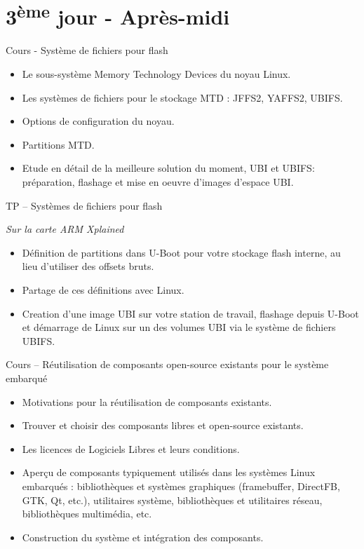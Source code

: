 \documentclass[a4paper,12pt,obeyspaces,spaces,hyphens]{article}
\begin{document}
\section{3\textsuperscript{ème} jour - Après-midi}

\feagendatwocolumn
{Cours - Système de fichiers pour flash}
{
  \begin{itemize}
  \item Le sous-système Memory Technology Devices du noyau Linux.
  \item Les systèmes de fichiers pour le stockage MTD : JFFS2, YAFFS2, UBIFS.
  \item Options de configuration du noyau.
  \item Partitions MTD.
  \item Etude en détail de la meilleure solution du moment, UBI et UBIFS:
	préparation, flashage et mise en oeuvre d'images d'espace UBI.

  \end{itemize}
}
{TP – Systèmes de fichiers pour flash}
{
  {\em Sur la carte ARM Xplained}
  \begin{itemize}
  \item Définition de partitions dans U-Boot pour
        votre stockage flash interne, au lieu d'utiliser
        des offsets bruts.
  \item Partage de ces définitions avec Linux.
  \item Creation d'une image UBI sur votre station de travail,
	flashage depuis U-Boot et démarrage de Linux sur un 
        des volumes UBI via le système de fichiers UBIFS.
  \end{itemize}
}

\feagendaonecolumn
{Cours – Réutilisation de composants open-source existants pour le système
embarqué}
{
  \begin{itemize}
  \item Motivations pour la réutilisation de composants existants.
  \item Trouver et choisir des composants libres et open-source existants.
  \item Les licences de Logiciels Libres et leurs conditions.
  \item Aperçu de composants typiquement utilisés dans les systèmes
	Linux embarqués : bibliothèques et systèmes graphiques (framebuffer,
	DirectFB, GTK, Qt, etc.), utilitaires système, bibliothèques et
	utilitaires réseau, bibliothèques multimédia, etc.
  \item Construction du système et intégration des composants.
  \end{itemize}
}
\end{document}
